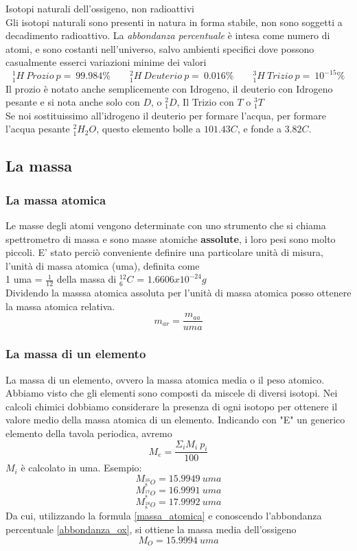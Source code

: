 \documentclass{article}
\begin{document}
Isotopi naturali dell'ossigeno, non radioattivi\\
Gli isotopi naturali sono presenti in natura in forma stabile, non sono soggetti a decadimento radioattivo.
La \textit{abbondanza percentuale} è intesa come numero di atomi, e sono costanti nell'universo, salvo ambienti specifici dove possono casualmente esserci variazioni minime dei valori
\[
^{1}_{1}H \ Prozio \ p= \ 99.984\% \qquad ^{2}_{1}H \ Deuterio\ p= \ 0.016\% 
 \qquad^{3}_{1}H \ Trizio \ p= \ 10^{-15}\% \]
Il prozio è notato anche semplicemente con Idrogeno, il deuterio con Idrogeno pesante e si nota anche solo con $D$, o $^2_1D$, Il Trizio con $T$ o $^3_1T$\\
Se noi sostituissimo all'idrogeno il deuterio per formare l'acqua, per formare l'acqua pesante $^2_1H_2O$, questo elemento bolle a $101.43C$, e fonde a $3.82C$.\\
\subsection{La massa}
\subsubsection{La massa atomica}
Le masse degli atomi vengono determinate con uno strumento che si chiama spettrometro di massa e sono masse atomiche \textbf{assolute},
i loro pesi sono molto piccoli.
E' stato perciò conveniente definire una particolare unità di misura, l'unità di massa atomica (uma), definita come \\
1 uma = $\frac{1}{12}$ della massa di $^{12}_6C$ = $1.6606 x 10^{-24}g$\\
Dividendo la masssa atomica assoluta per l'unità di massa atomica posso ottenere la massa atomica relativa.
\[m_{ar}= \frac{m_{aa}}{uma}\]
\subsubsection{La massa di un elemento}
\qquad La massa di un elemento, ovvero la massa atomica media o il peso atomico.\\
Abbiamo visto che gli elementi sono composti da miscele di diversi isotopi. Nei calcoli chimici
dobbiamo considerare la presenza di ogni isotopo per ottenere il valore medio della massa atomica di un 
elemento. Indicando con "E" un generico elemento della tavola periodica, avremo 
\begin{equation}\label{massa_atomica}M_e= \frac{\Sigma _i M_i \ p_i}{100}\end{equation}
$M_i$ è calcolato in uma.
Esempio:
\[M_{^{16}_8O}=15.9949 \ uma \]
\[M_{^{17}_8O}=16.9991 \ uma \]
\[M_{^{18}_8O}=17.9992 \ uma \]
Da cui, utilizzando la formula \eqref{massa_atomica} e conoscendo l'abbondanza percentuale \eqref{abbondanza_ox}, si ottiene la massa media dell'ossigeno
\[M_{O}=15.9994 \ uma \]
\end{document}
